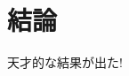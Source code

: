 \documentclass[../main]{subfiles}
\begin{document}
\newpage
\chapter{結論}
\label{chap:summary}
天才的な結果が出た!
\end{document}
